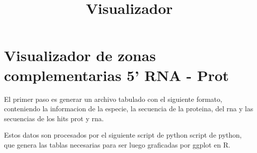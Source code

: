 \documentclass[11pt]{article}
\title{Visualizador}
\begin{document}
    
    
    \maketitle
    
    

    
    \section{Visualizador de zonas complementarias 5' RNA -
Prot}\label{visualizador-de-zonas-complementarias-5-rna---prot}

    El primer paso es generar un archivo tabulado con el siguiente formato,
conteniendo la informacion de la especie, la secuencia de la proteina,
del rna y las secuencias de los hits prot y rna.

    Estos datos son procesados por el siguiente script de python script de
python, que genera las tablas necesarias para ser luego graficadas por
ggplot en R.
\end{document}
